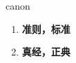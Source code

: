 
\begin{frame}
{\huge canon}
\begin{center}
\begin{enumerate}\Large
  \item \textbf{准则，标准}
  \item \textbf{真经，正典}
\end{enumerate}
\end{center}
\end{frame}
